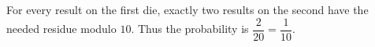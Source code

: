 For every result on the first die, exactly two results on the second have the needed residue modulo $10$. Thus the probability is $\dfrac{2}{20}=\boxed{\dfrac{1}{10}}$.

